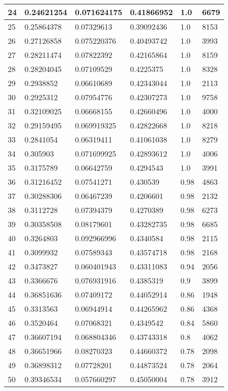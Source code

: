 \begin{longtable}{|l|l|l|l|l|l|}
24 & 0.24621254 & 0.071624175 & 0.41866952 & 1.0 & 6679 \\ \hline 
25 & 0.25864378 & 0.07329613 & 0.39092436 & 1.0 & 8153 \\ \hline 
26 & 0.27126858 & 0.075220376 & 0.40493742 & 1.0 & 3993 \\ \hline 
27 & 0.28211474 & 0.07822392 & 0.42165864 & 1.0 & 8159 \\ \hline 
28 & 0.28204045 & 0.07109529 & 0.4225375 & 1.0 & 8328 \\ \hline 
29 & 0.2938852 & 0.06610689 & 0.42343044 & 1.0 & 2113 \\ \hline 
30 & 0.2925312 & 0.07954776 & 0.42307273 & 1.0 & 9758 \\ \hline 
31 & 0.32109025 & 0.06668155 & 0.42660496 & 1.0 & 4000 \\ \hline 
32 & 0.29159495 & 0.069919325 & 0.42822668 & 1.0 & 8218 \\ \hline 
33 & 0.2841054 & 0.06319411 & 0.41061038 & 1.0 & 8279 \\ \hline 
34 & 0.305903 & 0.071699925 & 0.42893612 & 1.0 & 4006 \\ \hline 
35 & 0.3175789 & 0.06642759 & 0.4294543 & 1.0 & 3991 \\ \hline 
36 & 0.31216452 & 0.07541271 & 0.430539 & 0.98 & 4863 \\ \hline 
37 & 0.30288306 & 0.06467239 & 0.4206601 & 0.98 & 2132 \\ \hline 
38 & 0.3112728 & 0.07394379 & 0.4270389 & 0.98 & 6273 \\ \hline 
39 & 0.30358508 & 0.08179601 & 0.43282735 & 0.98 & 6685 \\ \hline 
40 & 0.3264803 & 0.092966996 & 0.4340584 & 0.98 & 2115 \\ \hline 
41 & 0.3099932 & 0.07589343 & 0.43574718 & 0.98 & 2168 \\ \hline 
42 & 0.3473827 & 0.060401943 & 0.43311083 & 0.94 & 2056 \\ \hline 
43 & 0.3366676 & 0.076931916 & 0.4385319 & 0.9 & 3899 \\ \hline 
44 & 0.36851636 & 0.07409172 & 0.44052914 & 0.86 & 1948 \\ \hline 
45 & 0.3313563 & 0.06944914 & 0.44265962 & 0.86 & 4368 \\ \hline 
46 & 0.3520464 & 0.07068321 & 0.4349542 & 0.84 & 5860 \\ \hline 
47 & 0.36607194 & 0.068804346 & 0.43743318 & 0.8 & 4062 \\ \hline 
48 & 0.36651966 & 0.08270323 & 0.44660372 & 0.78 & 2098 \\ \hline 
49 & 0.36898312 & 0.07728201 & 0.44873524 & 0.78 & 2064 \\ \hline 
50 & 0.39346534 & 0.057660297 & 0.45050004 & 0.78 & 3912 \\ \hline 
\end{longtable}